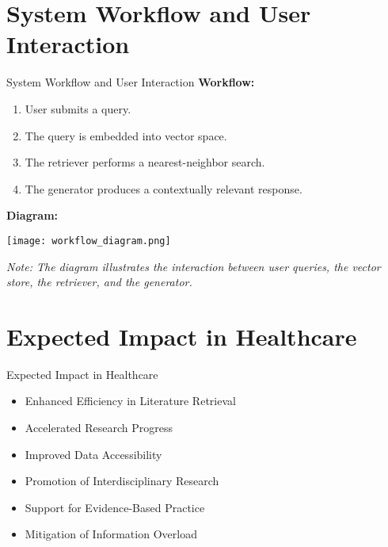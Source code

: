 \documentclass{beamer}
\begin{document}
\section{System Workflow and User Interaction}
\begin{frame}{System Workflow and User Interaction}
  \textbf{Workflow:}
  \begin{enumerate}
    \item User submits a query.
    \item The query is embedded into vector space.
    \item The retriever performs a nearest-neighbor search.
    \item The generator produces a contextually relevant response.
  \end{enumerate}
  \textbf{Diagram:}
  \begin{center}
    \texttt{[image: workflow\_diagram.png]}
  \end{center}
  \textit{Note: The diagram illustrates the interaction between user queries, the vector store, the retriever, and the generator.}
\end{frame}

\section{Expected Impact in Healthcare}
\begin{frame}{Expected Impact in Healthcare}
  \begin{itemize}
    \item Enhanced Efficiency in Literature Retrieval
    \item Accelerated Research Progress
    \item Improved Data Accessibility
    \item Promotion of Interdisciplinary Research
    \item Support for Evidence-Based Practice
    \item Mitigation of Information Overload
  \end{itemize}
\end{frame}
\end{document}
